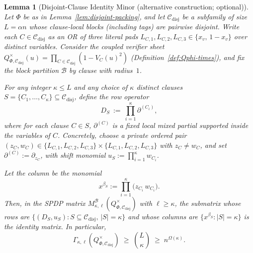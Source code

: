 \documentclass[12pt]{article}
\newtheorem{lemma}[theorem]{Lemma}
\theoremstyle{definition}
\theoremstyle{definition}
\theoremstyle{remark}
\theoremstyle{remark}
\begin{document}
\begin{lemma}[Disjoint-Clause Identity Minor (alternative construction; optional)]\label{lem:disjoint-identity}
Let $\Phi$ be as in Lemma~\ref{lem:disjoint-packing}, and let $\mathcal C_\mathrm{disj}$ be a subfamily of size $L=\alpha n$ whose clause-local blocks (including tags) are pairwise disjoint.
Write each $C\in\mathcal C_\mathrm{disj}$ as an OR of three literal pads $L_{C,1},L_{C,2},L_{C,3}\in\{x_v,\,1-x_v\}$ over distinct variables.
Consider the coupled verifier sheet $Q_{\Phi,\mathcal{C}_\mathrm{disj}}^{\times}(u) = \prod_{C\in\mathcal{C}_\mathrm{disj}}(1-V_C(u)^2)$ (Definition~\ref{def:Qphi-times}), and fix the block partition $\mathcal B$ by clause with radius~$1$.

For any integer $\kappa\le L$ and any choice of $\kappa$ distinct clauses $S=\{C_1,\dots,C_\kappa\}\subseteq\mathcal C_\mathrm{disj}$,
define the row operator
\[
D_S\ :=\ \prod_{i=1}^\kappa \partial^{(C_i)},
\]
where for each clause $C\in S$, $\partial^{(C)}$ is a fixed local mixed partial supported
inside the variables of $C$. Concretely, choose a private ordered pair
$(z_C,w_C)\in\{L_{C,1},L_{C,2},L_{C,3}\}\times\{L_{C,1},L_{C,2},L_{C,3}\}$
with $z_C\neq w_C$, and set $\partial^{(C)} := \partial_{z_C}$, with shift monomial $u_S := \prod_{i=1}^\kappa w_{C_i}$.

Let the column be the monomial
\[
x^{\beta_S} := \prod_{i=1}^\kappa \big(z_{C_i}\,w_{C_i}\big).
\]
Then, in the SPDP matrix $M^{\mathcal B}_{\kappa,\ell}(Q_{\Phi,\mathcal{C}_\mathrm{disj}}^{\times})$ with $\ell\ge \kappa$, the submatrix whose rows are
$\{(D_S,u_S): S\subseteq\mathcal C_\mathrm{disj},\,|S|=\kappa\}$ and whose columns are $\{x^{\beta_S}: |S|=\kappa\}$
is the identity matrix. In particular,
\[
\Gamma_{\kappa,\ell}(Q_{\Phi,\mathcal{C}_\mathrm{disj}}^{\times})\;\ge\;\binom{L}{\kappa}\;\ge\; n^{\Omega(\kappa)}.
\]
\end{lemma}
\end{document}
